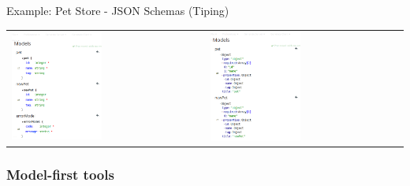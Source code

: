 \begin{frame}[allowframebreaks]
	\begin{exampleblock}{Example: Pet Store - JSON Schemas (Tiping)}
		\begin{tabularx}{\textwidth}{X||X}
			\includegraphics[width=0.48\textwidth]{./img/api_example_schemas1_alpha.png} &
			\includegraphics[width=0.48\textwidth]{./img/api_example_schemas2_alpha.png}
		\end{tabularx}
	\end{exampleblock}
	
\end{frame}

\subsubsection{Model-first tools}


